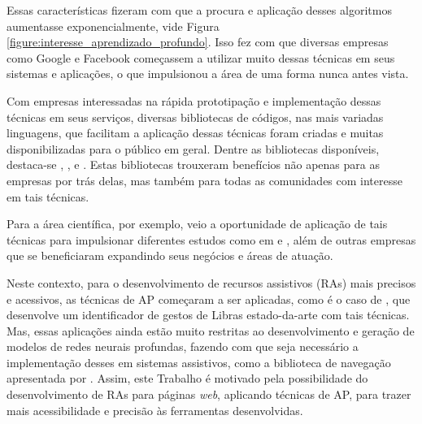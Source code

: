 \par Essas características fizeram com que a procura e aplicação desses algoritmos aumentasse exponencialmente, vide Figura \ref{figure:interesse_aprendizado_profundo}. Isso fez com que diversas empresas como Google e Facebook começassem a utilizar muito dessas técnicas em seus sistemas e aplicações, o que impulsionou a área de uma forma nunca antes vista.


\par Com empresas interessadas na rápida prototipação e implementação dessas técnicas em seus serviços, diversas bibliotecas de códigos, nas mais variadas linguagens, que facilitam a aplicação dessas técnicas foram criadas e muitas disponibilizadas para o público em geral. Dentre as bibliotecas disponíveis, destaca-se , ,  e  . Estas bibliotecas trouxeram benefícios não apenas para as empresas por trás delas, mas também para todas as comunidades com interesse em tais técnicas.

\par Para a área científica, por exemplo, veio a oportunidade de aplicação de tais técnicas para impulsionar diferentes estudos como em  e , além de outras empresas que se beneficiaram expandindo seus negócios e áreas de atuação.

\par Neste contexto, para o desenvolvimento de recursos assistivos (RAs) mais precisos e acessivos, as técnicas de AP começaram a ser aplicadas, como é o caso de , que desenvolve um identificador de gestos de Libras estado-da-arte com tais técnicas. Mas, essas aplicações ainda estão muito restritas ao desenvolvimento e geração de modelos de redes neurais profundas, fazendo com que seja necessário a implementação desses em sistemas assistivos, como a biblioteca de navegação apresentada por . Assim, este Trabalho é motivado pela possibilidade do desenvolvimento de RAs para páginas \textit{web}, aplicando técnicas de AP, para trazer mais acessibilidade e precisão às ferramentas desenvolvidas.




